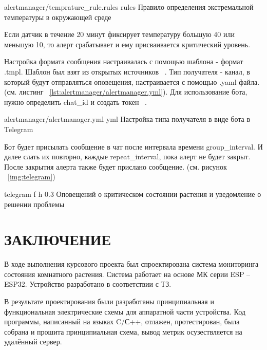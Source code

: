 \documentclass{bmstu}
\begin{document}
        {alertmanager/temprature_rule.rules}
        {rules}
        {Правило определения экстремальной температуры в окружающей среде}

    Если датчик в течение 20 минут фиксирует температуру большую 40 или меньшую 10, то алерт срабатывает
    и ему присваивается критический уровень.

    Настройка формата сообщения настраивалась с помощью шаблона - формат .tmpl.
    Шаблон был взят из открытых источников ~\cite{TelegramMessageTemplate}.
    Тип получателя - канал, в который будут отправляться оповещения, настраивается с помощью .yaml файла.
    (см. листинг ~\ref{lst:alertmanager/alertmanager.yml}).
    Для использование бота, нужно определить chat\_id и создать токен ~\cite{262588213843476HowGetTelegram}.

        {alertmanager/alertmanager.yml} %
        {yml}
        {Настройка типа получателя в виде бота в Telegram} %

    Бот будет присылать сообщение в чат после интервала времени group\_interval.
    И далее слать их повторно, каждые repeat\_interval, пока алерт не будет закрыт.
    После закрытия алерта также будет прислано сообщение. (см. рисунок ~\ref{img:telegram})

        {telegram}
        {f}
        {h}
        {0.3\textwidth}
        {Оповещений о критическом состоянии растения и уведомление о решении проблемы}


    \chapter*{ЗАКЛЮЧЕНИЕ}

    В ходе выполнения курсового проекта был спроектирована система мониторинга состояния комнатного растения.
    Система работает на основе МК серии ESP – ESP32.
    Устройство разработано в соответствии с ТЗ.

    В результате проектирования были разработаны принципиальная и функциональная электрические схемы для аппаратной части устройства. Код программы, написанный на языках C/С++, отлажен, протестирован, была собрана и прошита принципиальная схема, вывод метрик осузествляется на удалённый сервер.

    \makebibliography
\end{document}
